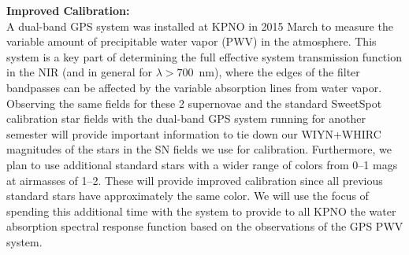 \documentclass[11pt]{article}
\begin{document}
%
%

{\bf Improved Calibration:}\\
A dual-band GPS system was installed at KPNO in 2015 March to measure the variable amount of precipitable water vapor (PWV) in the atmosphere.  
This system is a key part of determining the full effective system transmission function in the NIR (and in general for $\lambda>700$~nm), where the edges of the filter bandpasses can be affected by the variable absorption lines from water vapor.  
Observing the same fields for these 2 supernovae and the standard SweetSpot calibration star fields with the dual-band GPS system running for another semester will provide important information to tie down our WIYN+WHIRC magnitudes of the stars in the SN fields we use for calibration.  
Furthermore, we plan to use additional standard stars with a wider range of colors from 0--1 mags at airmasses of 1--2. 
These will provide improved calibration since all previous standard stars have approximately the same color. 
We will use the focus of spending this additional time with the system to provide to all KPNO the water absorption spectral response function based on the observations of the GPS PWV system.
\end{document}
